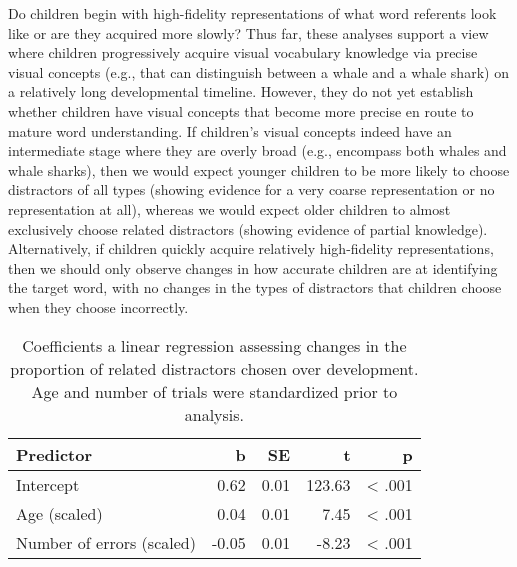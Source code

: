 \documentclass[
  man,mask]{apa6}
\begin{document}
Do children begin with high-fidelity representations of what word referents look like or are they acquired more slowly? Thus far, these analyses support a view where children progressively acquire visual vocabulary knowledge via precise visual concepts (e.g., that can distinguish between a whale and a whale shark) on a relatively long developmental timeline. However, they do not yet establish whether children have visual concepts that become more precise en route to mature word understanding. If children's visual concepts indeed have an intermediate stage where they are overly broad (e.g., encompass both whales and whale sharks), then we would expect younger children to be more likely to choose distractors of all types (showing evidence for a very coarse representation or no representation at all), whereas we would expect older children to almost exclusively choose related distractors (showing evidence of partial knowledge). Alternatively, if children quickly acquire relatively high-fidelity representations, then we should only observe changes in how accurate children are at identifying the target word, with no changes in the types of distractors that children choose when they choose incorrectly.

\begin{table}
\centering
\caption{\label{tab:unnamed-chunk-22}Coefficients a linear regression assessing changes in the proportion of related distractors chosen over development. Age and number of trials were standardized prior to analysis.}
\centering
\begin{tabular}[t]{lrrrr}
\toprule
Predictor & b & SE & t & p\\
\midrule
Intercept & 0.62 & 0.01 & 123.63 & < .001\\
Age (scaled) & 0.04 & 0.01 & 7.45 & < .001\\
Number of errors (scaled) & -0.05 & 0.01 & -8.23 & < .001\\
\bottomrule
\end{tabular}
\end{table}
\end{document}
